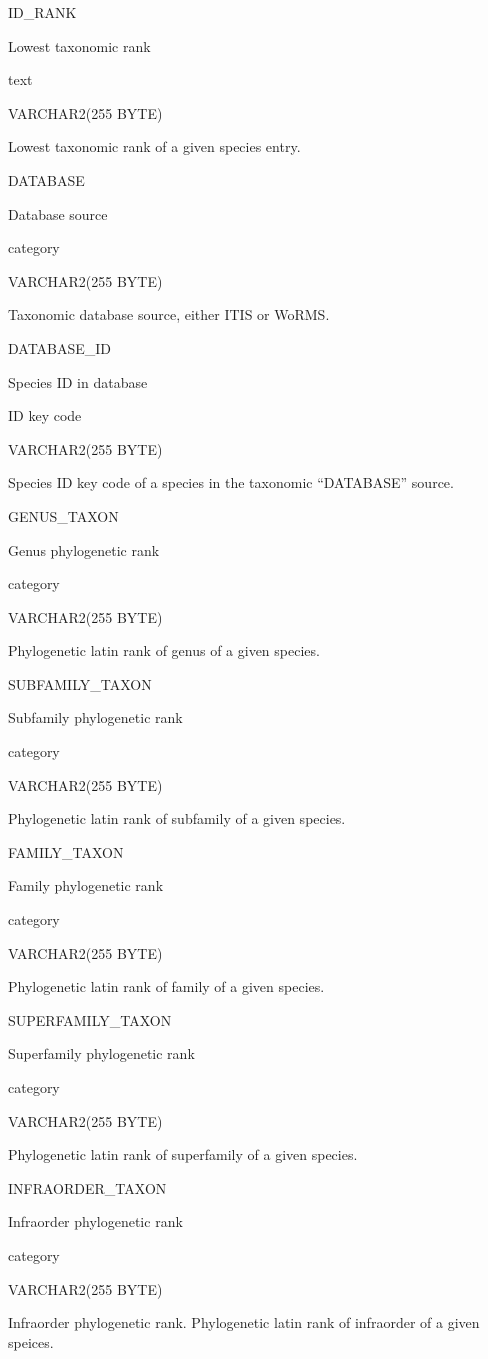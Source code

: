\documentclass[
  letterpaper,
  oneside,
  open=any]{scrbook}
\begin{document}
ID\_RANK

Lowest taxonomic rank

text

VARCHAR2(255 BYTE)

Lowest taxonomic rank of a given species entry.

DATABASE

Database source

category

VARCHAR2(255 BYTE)

Taxonomic database source, either ITIS or WoRMS.

DATABASE\_ID

Species ID in database

ID key code

VARCHAR2(255 BYTE)

Species ID key code of a species in the taxonomic ``DATABASE'' source.

GENUS\_TAXON

Genus phylogenetic rank

category

VARCHAR2(255 BYTE)

Phylogenetic latin rank of genus of a given species.

SUBFAMILY\_TAXON

Subfamily phylogenetic rank

category

VARCHAR2(255 BYTE)

Phylogenetic latin rank of subfamily of a given species.

FAMILY\_TAXON

Family phylogenetic rank

category

VARCHAR2(255 BYTE)

Phylogenetic latin rank of family of a given species.

SUPERFAMILY\_TAXON

Superfamily phylogenetic rank

category

VARCHAR2(255 BYTE)

Phylogenetic latin rank of superfamily of a given species.

INFRAORDER\_TAXON

Infraorder phylogenetic rank

category

VARCHAR2(255 BYTE)

Infraorder phylogenetic rank. Phylogenetic latin rank of infraorder of a
given speices.
\end{document}
